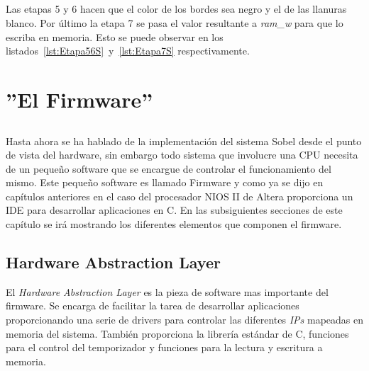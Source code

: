 \documentclass[a4paper,12pt,titlepage,final]{book}
\begin{document}


\paragraph{}
Las etapas 5 y 6 hacen que el color de los bordes sea negro y el de las llanuras blanco. Por último la etapa 7 se pasa el valor resultante a \textit{ram\_w} para que lo escriba en memoria. Esto se puede observar en los listados~\ref{lst:Etapa56S}~y~\ref{lst:Etapa7S} respectivamente.





\chapter{''El Firmware''}
\section*{}
\subsection*{}
\subsubsection*{}

\paragraph{}
Hasta ahora se ha hablado de la implementación del sistema Sobel desde el punto de vista del hardware, sin embargo todo sistema que involucre una CPU necesita de un pequeño software que se encargue de controlar el funcionamiento del mismo. Este pequeño software es llamado Firmware y como ya se dijo en capítulos anteriores en el caso del procesador NIOS II de Altera proporciona un IDE para desarrollar aplicaciones en C. En las subsiguientes secciones de este capítulo se irá mostrando los diferentes elementos que componen el firmware.

\section{Hardware Abstraction Layer}
El \textit{Hardware Abstraction Layer} es la pieza de software mas importante del firmware. Se encarga de facilitar la tarea de desarrollar aplicaciones proporcionando una serie de drivers para controlar las diferentes \textit{IPs} mapeadas en memoria del sistema. También proporciona la librería estándar de C, funciones para el control del temporizador y funciones para la lectura y escritura a memoria.
\end{document}
